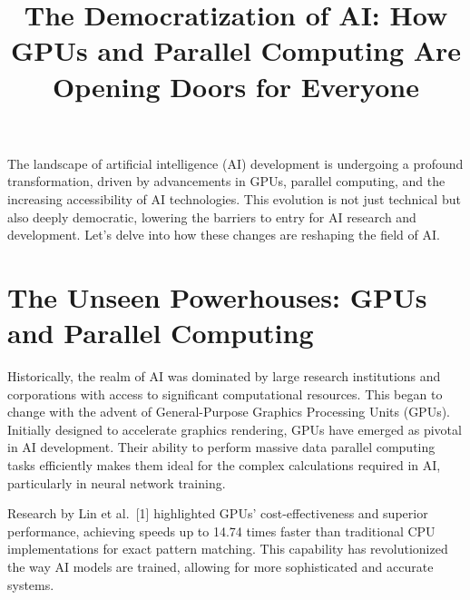 \documentclass[
  journal,
]{IEEEtran}%
\title{The Democratization of AI: How GPUs and Parallel Computing Are
Opening Doors for Everyone}
\author{

}
\begin{document}


\maketitle


%


The landscape of artificial intelligence (AI) development is undergoing
a profound transformation, driven by advancements in GPUs, parallel
computing, and the increasing accessibility of AI technologies. This
evolution is not just technical but also deeply democratic, lowering the
barriers to entry for AI research and development. Let's delve into how
these changes are reshaping the field of AI.

\section{The Unseen Powerhouses: GPUs and Parallel
Computing}\label{the-unseen-powerhouses-gpus-and-parallel-computing}

Historically, the realm of AI was dominated by large research
institutions and corporations with access to significant computational
resources. This began to change with the advent of General-Purpose
Graphics Processing Units (GPUs). Initially designed to accelerate
graphics rendering, GPUs have emerged as pivotal in AI development.
Their ability to perform massive data parallel computing tasks
efficiently makes them ideal for the complex calculations required in
AI, particularly in neural network training.

Research by Lin et al.~{[}1{]} highlighted GPUs' cost-effectiveness and
superior performance, achieving speeds up to 14.74 times faster than
traditional CPU implementations for exact pattern matching. This
capability has revolutionized the way AI models are trained, allowing
for more sophisticated and accurate systems.
\end{document}
